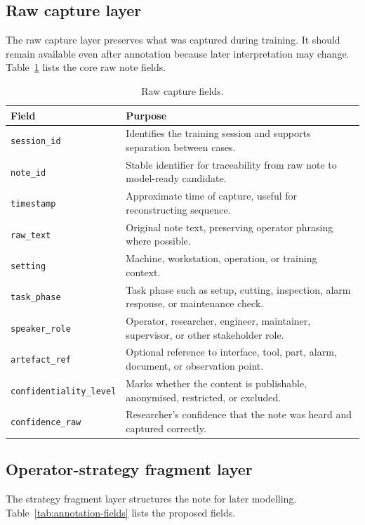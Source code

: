 \subsection{Raw capture layer}

The raw capture layer preserves what was captured during training. It should remain available even after annotation because later interpretation may change. Table~\ref{tab:raw-note-fields} lists the core raw note fields.

\begin{table}[htbp]
\centering
\caption{Raw capture fields.}
\label{tab:raw-note-fields}
\begin{tabularx}{\textwidth}{p{}X}
\toprule
Field & Purpose \\
\midrule
\texttt{session\_id} & Identifies the training session and supports separation between cases. \\
\texttt{note\_id} & Stable identifier for traceability from raw note to model-ready candidate. \\
\texttt{timestamp} & Approximate time of capture, useful for reconstructing sequence. \\
\texttt{raw\_text} & Original note text, preserving operator phrasing where possible. \\
\texttt{setting} & Machine, workstation, operation, or training context. \\
\texttt{task\_phase} & Task phase such as setup, cutting, inspection, alarm response, or maintenance check. \\
\texttt{speaker\_role} & Operator, researcher, engineer, maintainer, supervisor, or other stakeholder role. \\
\texttt{artefact\_ref} & Optional reference to interface, tool, part, alarm, document, or observation point. \\
\texttt{confidentiality\_level} & Marks whether the content is publishable, anonymised, restricted, or excluded. \\
\texttt{confidence\_raw} & Researcher's confidence that the note was heard and captured correctly. \\
\bottomrule
\end{tabularx}
\end{table}

\subsection{Operator-strategy fragment layer}

The strategy fragment layer structures the note for later modelling. Table~\ref{tab:annotation-fields} lists the proposed fields.


